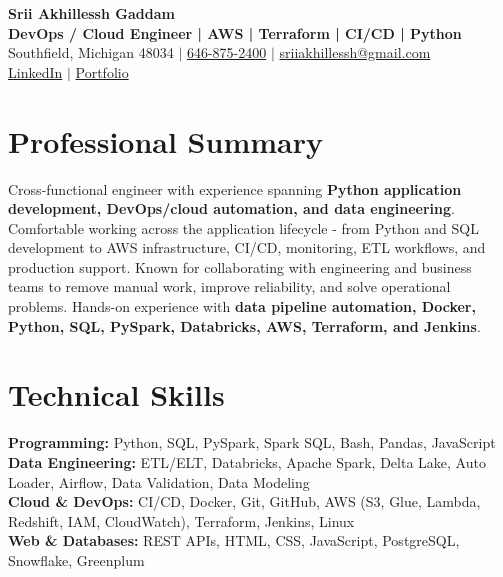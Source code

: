 \documentclass[letterpaper,10pt]{article}
\begin{document}
\fontsize{9.35pt}{10.45pt}\selectfont

\begin{center}
    {\LARGE \textbf{Srii Akhillessh Gaddam}} \\[-1pt]
    \textbf{DevOps / Cloud Engineer | AWS | Terraform | CI/CD | Python} \\[2pt]
    Southfield, Michigan 48034 $|$
    \href{tel:6468752400}{646-875-2400} $|$
    \href{mailto:sriiakhillessh@gmail.com}{sriiakhillessh@gmail.com} \\[1pt]
    \href{https://www.linkedin.com/in/srii-akhiilessh-gaddam-b48668191/}{LinkedIn} $|$
    \href{https://sriiakhillesshg.github.io/portfolio/}{Portfolio}
\end{center}
\vspace{-8pt}

\section{Professional Summary}
\small{Cross-functional engineer with experience spanning \textbf{Python application development, DevOps/cloud automation, and data engineering}. Comfortable working across the application lifecycle - from Python and SQL development to AWS infrastructure, CI/CD, monitoring, ETL workflows, and production support. Known for collaborating with engineering and business teams to remove manual work, improve reliability, and solve operational problems. Hands-on experience with \textbf{data pipeline automation, Docker, Python, SQL, PySpark, Databricks, AWS, Terraform, and Jenkins}.}

\section{Technical Skills}
\small{
\textbf{Programming:} Python, SQL, PySpark, Spark SQL, Bash, Pandas, JavaScript \\
\textbf{Data Engineering:} ETL/ELT, Databricks, Apache Spark, Delta Lake, Auto Loader, Airflow, Data Validation, Data Modeling \\
\textbf{Cloud \& DevOps:} CI/CD, Docker, Git, GitHub, AWS (S3, Glue, Lambda, Redshift, IAM, CloudWatch), Terraform, Jenkins, Linux \\
\textbf{Web \& Databases:} REST APIs, HTML, CSS, JavaScript, PostgreSQL, Snowflake, Greenplum
}
\end{document}
